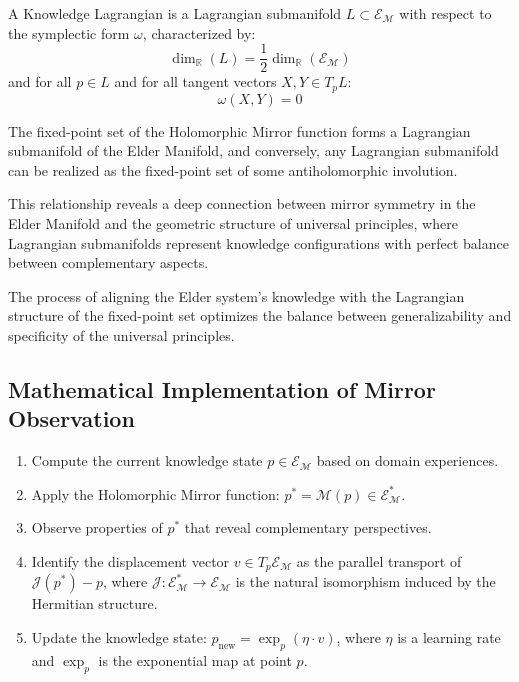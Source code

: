 \begin{definition}
A Knowledge Lagrangian is a Lagrangian submanifold $L \subset \mathcal{E}_{\mathcal{M}}$ with respect to the symplectic form $\omega$, characterized by:
\begin{equation}
\dim_{\mathbb{R}}(L) = \frac{1}{2}\dim_{\mathbb{R}}(\mathcal{E}_{\mathcal{M}})
\end{equation}
and for all $p \in L$ and for all tangent vectors $X, Y \in T_pL$:
\begin{equation}
\omega(X, Y) = 0
\end{equation}
\end{definition}

\begin{theorem}
The fixed-point set of the Holomorphic Mirror function forms a Lagrangian submanifold of the Elder Manifold, and conversely, any Lagrangian submanifold can be realized as the fixed-point set of some antiholomorphic involution.
\end{theorem}

This relationship reveals a deep connection between mirror symmetry in the Elder Manifold and the geometric structure of universal principles, where Lagrangian submanifolds represent knowledge configurations with perfect balance between complementary aspects.

\begin{proposition}
The process of aligning the Elder system's knowledge with the Lagrangian structure of the fixed-point set optimizes the balance between generalizability and specificity of the universal principles.
\end{proposition}

\subsection{Mathematical Implementation of Mirror Observation}

\begin{theorem}
\begin{enumerate}
\item Compute the current knowledge state $p \in \mathcal{E}_{\mathcal{M}}$ based on domain experiences.
\item Apply the Holomorphic Mirror function: $p^* = \mathcal{M}(p) \in \mathcal{E}_{\mathcal{M}}^*$.
\item Observe properties of $p^*$ that reveal complementary perspectives.
\item Identify the displacement vector $v \in T_p\mathcal{E}_{\mathcal{M}}$ as the parallel transport of $\mathcal{J}(p^*) - p$, where $\mathcal{J}: \mathcal{E}_{\mathcal{M}}^* \rightarrow \mathcal{E}_{\mathcal{M}}$ is the natural isomorphism induced by the Hermitian structure.
\item Update the knowledge state: $p_{\text{new}} = \exp_p(\eta \cdot v)$, where $\eta$ is a learning rate and $\exp_p$ is the exponential map at point $p$.
\end{enumerate}
\end{theorem}

